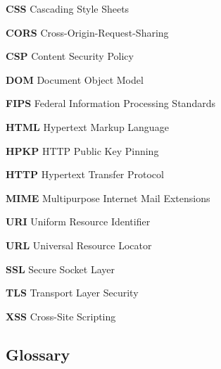 \documentclass{mscreport}
\begin{document}
\noindent \textbf{CSS} Cascading Style Sheets \par
\noindent \textbf{CORS} Cross-Origin-Request-Sharing \par
\noindent \textbf{CSP} Content Security Policy \par
\vspace{0.5cm}
\noindent \textbf{DOM} Document Object Model \par
\vspace{0.5cm}
\noindent \textbf{FIPS} Federal Information Processing Standards \par
\vspace{0.5cm}
\noindent \textbf{HTML} Hypertext Markup Language \par
\noindent \textbf{HPKP} HTTP Public Key Pinning \par
\noindent \textbf{HTTP} Hypertext Transfer Protocol \par
\vspace{0.5cm}
\noindent \textbf{MIME} Multipurpose Internet Mail Extensions \par
\vspace{0.5cm}
\noindent \textbf{URI} Uniform Resource Identifier \par
\noindent \textbf{URL} Universal Resource Locator \par
\vspace{0.5cm}
\noindent \textbf{SSL} Secure Socket Layer \par
\vspace{0.5cm}
\noindent \textbf{TLS} Transport Layer Security \par
\vspace{0.5cm}
\noindent \textbf{XSS} Cross-Site Scripting \par

\newpage

\begin{center}
\section*{Glossary}
\end{center}
\end{document}
